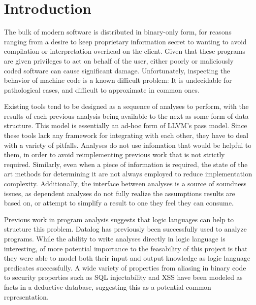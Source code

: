 \chapter{Introduction}
%
%
The bulk of modern software is distributed in binary-only form, for reasons ranging from a desire to keep proprietary information secret to wanting to avoid compilation or interpretation overhead on the client.
Given that these programs are given privileges to act on behalf of the user, either poorly or maliciously coded software can cause significant damage.
Unfortunately, inspecting the behavior of machine code is a known difficult problem:
It is undecidable for pathological cases, and difficult to approximate in common ones.
 
Existing tools tend to be designed as a sequence of analyses to perform, with the results of each previous analysis being available to the next as some form of data structure.
This model is essentially an ad-hoc form of LLVM\cite{llvm}'s pass model.
Since these tools lack any framework for integrating with each other, they have to deal with a variety of pitfalls.
Analyses do not use infomation that would be helpful to them, in order to avoid reimplementing previous work that is not strictly required.
Similarly, even when a piece of information is required, the state of the art methods for determining it are not always employed to reduce implementation complexity.
Additionally, the interface between analyses is a source of soundness issues, as dependent analyses do not fully realize the assumptions results are based on, or attempt to simplify a result to one they feel they can consume.

Previous work in program analysis suggests that logic languages can help to structure this problem.
Datalog has previously been successfully used to analyze programs\cite{Lam2005a, Brumley2006b, Alpuente2011, Smaragdakis, Whaley2007}. 
While the ability to write analyses directly in logic language is interesting, of more potential importance to the feasability of this project is that they were able to model both their input and output knowledge as logic language predicates successfully.
A wide variety of properties from aliasing in binary code\cite{Brumley2006b} to security properties such as SQL injectability and XSS\cite{Lam2005a} have been modeled as facts in a deductive database, suggesting this as a potential common representation. 

